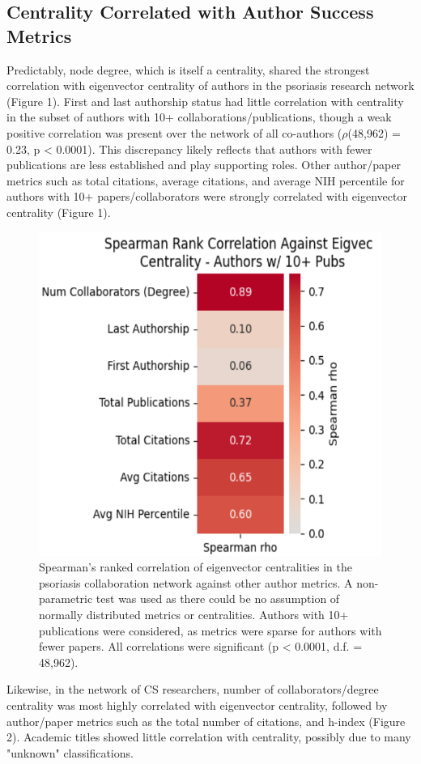 \documentclass[9pt,twocolumn,twoside]{pnas-new}
\begin{document}
\subsection*{Centrality Correlated with Author Success Metrics} Predictably, node degree, which is itself a centrality, shared the strongest correlation with eigenvector centrality of authors in the psoriasis research network (Figure 1). First and last authorship status had little correlation with centrality in the subset of authors with 10+ collaborations/publications, though a weak positive correlation was present over the network of all co-authors ($\rho$(48,962) = 0.23, p < 0.0001). This discrepancy likely reflects that authors with fewer publications are less established and play supporting roles. Other author/paper metrics such as total citations, average citations, and average NIH percentile for authors with 10+ papers/collaborators were strongly correlated with eigenvector centrality (Figure 1). 
\begin{figure}[H]
    \centering
        \includegraphics[width=0.25\textheight]{PsoriasisCentrality.png}
    \caption{Spearman's ranked correlation of eigenvector centralities in the psoriasis collaboration network against other author metrics. A non-parametric test was used as there could be no assumption of normally distributed metrics or centralities. Authors with 10+ publications were considered, as metrics were sparse for authors with fewer papers. All correlations were significant (p < 0.0001, d.f. = 48,962).}
    \label{fig:psoriasiscentrality}
\end{figure}
\noindent Likewise, in the network of CS researchers, number of collaborators/degree centrality was most highly correlated with eigenvector centrality, followed by author/paper metrics such as the total number of citations, and h-index (Figure 2). Academic titles showed little correlation with centrality, possibly due to many "unknown" classifications.
\end{document}
